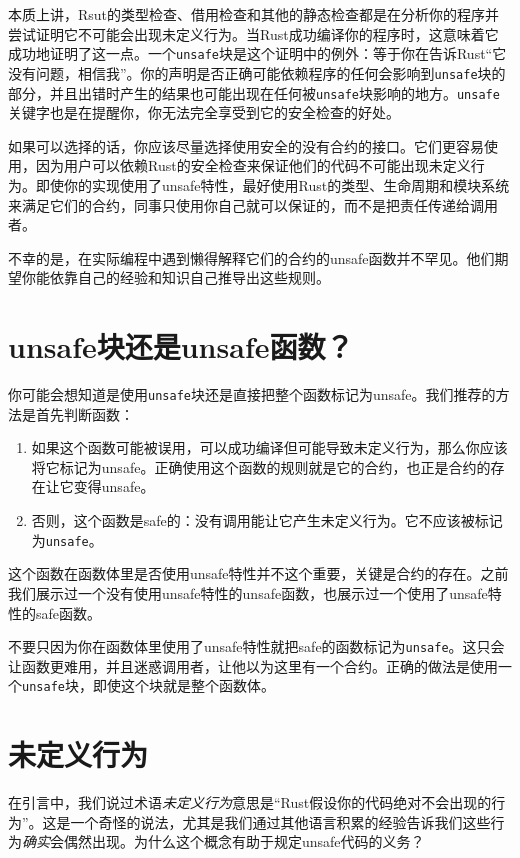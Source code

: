本质上讲，Rsut的类型检查、借用检查和其他的静态检查都是在分析你的程序并尝试证明它不可能会出现未定义行为。当Rust成功编译你的程序时，这意味着它成功地证明了这一点。一个\texttt{unsafe}块是这个证明中的例外：等于你在告诉Rust“它没有问题，相信我”。你的声明是否正确可能依赖程序的任何会影响到\texttt{unsafe}块的部分，并且出错时产生的结果也可能出现在任何被\texttt{unsafe}块影响的地方。\texttt{unsafe}关键字也是在提醒你，你无法完全享受到它的安全检查的好处。

如果可以选择的话，你应该尽量选择使用安全的没有合约的接口。它们更容易使用，因为用户可以依赖Rust的安全检查来保证他们的代码不可能出现未定义行为。即使你的实现使用了unsafe特性，最好使用Rust的类型、生命周期和模块系统来满足它们的合约，同事只使用你自己就可以保证的，而不是把责任传递给调用者。

不幸的是，在实际编程中遇到懒得解释它们的合约的unsafe函数并不罕见。他们期望你能依靠自己的经验和知识自己推导出这些规则。

\section{unsafe块还是unsafe函数？}
你可能会想知道是使用\texttt{unsafe}块还是直接把整个函数标记为unsafe。我们推荐的方法是首先判断函数：
\begin{enumerate}
    \item 如果这个函数可能被误用，可以成功编译但可能导致未定义行为，那么你应该将它标记为unsafe。正确使用这个函数的规则就是它的合约，也正是合约的存在让它变得unsafe。
    \item 否则，这个函数是safe的：没有调用能让它产生未定义行为。它不应该被标记为\texttt{unsafe}。
\end{enumerate}

这个函数在函数体里是否使用unsafe特性并不这个重要，关键是合约的存在。之前我们展示过一个没有使用unsafe特性的unsafe函数，也展示过一个使用了unsafe特性的safe函数。

不要只因为你在函数体里使用了unsafe特性就把safe的函数标记为\texttt{unsafe}。这只会让函数更难用，并且迷惑调用者，让他以为这里有一个合约。正确的做法是使用一个\texttt{unsafe}块，即使这个块就是整个函数体。

\section{未定义行为}
在引言中，我们说过术语\emph{未定义行为}意思是“Rust假设你的代码绝对不会出现的行为”。这是一个奇怪的说法，尤其是我们通过其他语言积累的经验告诉我们这些行为\emph{确实}会偶然出现。为什么这个概念有助于规定unsafe代码的义务？

